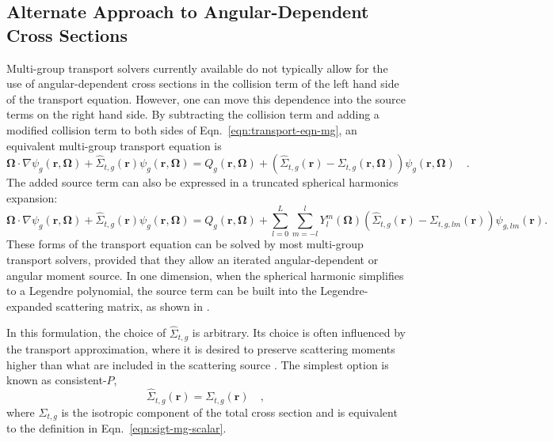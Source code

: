 
\subsection{Alternate Approach to Angular-Dependent Cross Sections}
\label{subsec:alternate-angle}

Multi-group transport solvers currently available do not typically allow for the use of angular-dependent cross sections in the collision term of the left hand side of the transport equation.  However, one can move this dependence into the source terms on the right hand side.  By subtracting the collision term and adding a modified collision term to both sides of Eqn.~\ref{eqn:transport-eqn-mg}, an equivalent multi-group transport equation is
%
\begin{dmath}
\mathbf{\Omega} \cdot \nabla \psi_{g}(\mathbf{r},\mathbf{\Omega}) + \hat{\Sigma}_{t,g}(\mathbf{r})\psi_{g}(\mathbf{r},\mathbf{\Omega}) = Q_{g}(\mathbf{r},\mathbf{\Omega}) + \left(\hat{\Sigma}_{t,g}(\mathbf{r})-\Sigma_{t,g}(\mathbf{r},\mathbf{\Omega})\right)\psi_{g}(\mathbf{r},\mathbf{\Omega}) \quad .
\end{dmath}
%
The added source term can also be expressed in a truncated spherical harmonics expansion:
%
\begin{dmath}
\mathbf{\Omega} \cdot \nabla \psi_{g}(\mathbf{r},\mathbf{\Omega}) + \hat{\Sigma}_{t,g}(\mathbf{r})\psi_{g}(\mathbf{r},\mathbf{\Omega}) = Q_{g}(\mathbf{r},\mathbf{\Omega}) + 
\sum_{l=0}^L \sum_{m=-l}^{l} Y_l^m (\mathbf{\Omega})
\left(\hat{\Sigma}_{t,g}(\mathbf{r})-\Sigma_{t,g,lm}(\mathbf{r})\right)\psi_{g,lm}(\mathbf{r}) .
\end{dmath}
%
These forms of the transport equation can be solved by most multi-group transport solvers, provided that they allow an iterated angular-dependent or angular moment source.  In one dimension, when the spherical harmonic simplifies to a Legendre polynomial, the source term can be built into the Legendre-expanded scattering matrix, as shown in \citep{macfarlane2000njoy} . 

In this formulation, the choice of $\hat{\Sigma}_{t, g}$ is arbitrary.  Its choice is often influenced by the transport approximation, where it is desired to preserve scattering moments higher than what are included in the scattering source \citep{bell1967transport}.  The simplest option is known as consistent-$P$,
%
\begin{dmath}
\hat{\Sigma}_{t, g}(\mathbf{r}) = \Sigma_{t,g}(\mathbf{r}) \quad ,
\end{dmath}
%
where $\Sigma_{t,g}$ is the isotropic component of the total cross section and is equivalent to the definition in Eqn.~\ref{eqn:sigt-mg-scalar}. 

